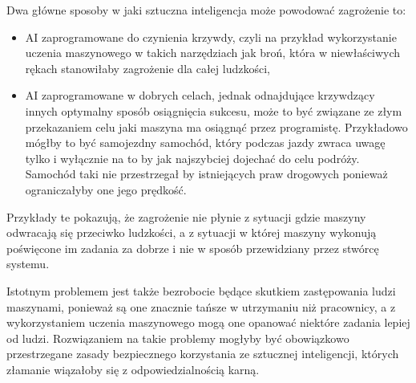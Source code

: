 Dwa główne sposoby w jaki sztuczna inteligencja może powodować zagrożenie to:
\begin{itemize}
    \item AI zaprogramowane do czynienia krzywdy, czyli na przykład wykorzystanie uczenia maszynowego
    w takich narzędziach jak broń, która w niewłaściwych rękach stanowiłaby zagrożenie dla całej ludzkości,
    \item AI zaprogramowane w dobrych celach, jednak odnajdujące krzywdzący innych optymalny
    sposób osiągnięcia sukcesu, może to być związane ze złym przekazaniem celu jaki maszyna ma osiągnąć przez 
    programistę. Przykładowo mógłby to być samojezdny samochód, który podczas jazdy zwraca uwagę tylko i wyłącznie 
    na to by jak najszybciej dojechać do celu podróży. Samochód taki nie przestrzegał by istniejących praw drogowych
    ponieważ ograniczałyby one jego prędkość.
\end{itemize}
Przykłady te pokazują, że zagrożenie nie płynie z sytuacji gdzie maszyny odwracają się przeciwko ludzkości, a 
z sytuacji w której maszyny wykonują poświęcone im zadania za dobrze i nie w sposób przewidziany przez 
stwórcę systemu.

Istotnym problemem jest także bezrobocie będące skutkiem zastępowania ludzi maszynami,
ponieważ są one znacznie tańsze w utrzymaniu niż pracownicy, a z wykorzystaniem uczenia
maszynowego mogą one opanować niektóre zadania lepiej od ludzi.
Rozwiązaniem na takie problemy mogłyby być obowiązkowo przestrzegane zasady bezpiecznego korzystania
ze sztucznej inteligencji, których złamanie wiązałoby się z odpowiedzialnością karną.